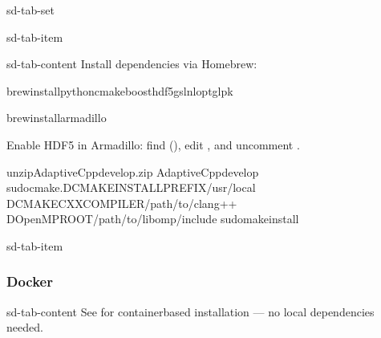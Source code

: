 \documentclass[a4paper,10pt,english]{sphinxmanual}
\begin{document}
\begin{sphinxuseclass}{sd-tab-set}
\begin{sphinxuseclass}{sd-tab-item}
\begin{sphinxuseclass}{sd-tab-content}
\sphinxAtStartPar
Install dependencies via Homebrew:

\begin{sphinxVerbatim}[commandchars=\\\{\}]
brewinstallpythoncmakeboosthdf5gslnloptglpk
\end{sphinxVerbatim}

\sphinxAtStartPar
{}

\begin{sphinxVerbatim}[commandchars=\\\{\}]
brewinstallarmadillo
\end{sphinxVerbatim}

\sphinxAtStartPar
Enable HDF5 in Armadillo: find 
(), edit ,
and uncomment .

\sphinxAtStartPar
{}

\begin{sphinxVerbatim}[commandchars=\\\{\}]
unzipAdaptiveCpp\PYGZhy{}develop.zip
AdaptiveCpp\PYGZhy{}develop
sudocmake.\PYGZhy{}DCMAKE\PYGZus{}INSTALL\PYGZus{}PREFIX/usr/local
\PYGZhy{}DCMAKE\PYGZus{}CXX\PYGZus{}COMPILER/path/to/clang++
\PYGZhy{}DOpenMP\PYGZus{}ROOT/path/to/libomp/include
sudomakeinstall
\end{sphinxVerbatim}

\end{sphinxuseclass}
\end{sphinxuseclass}
\begin{sphinxuseclass}{sd-tab-item}\subsubsection*{Docker}

\begin{sphinxuseclass}{sd-tab-content}
\sphinxAtStartPar
See {\hyperref[\detokenize{getting-started/docker::doc}]{}} for container\sphinxhyphen{}based installation — no local dependencies needed.

\end{sphinxuseclass}
\end{sphinxuseclass}
\end{sphinxuseclass}
\end{document}
